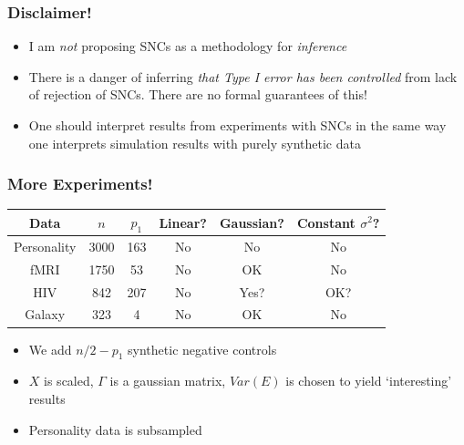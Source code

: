 \documentclass{beamer}
\begin{document}
\begin{frame}
\frametitle{Disclaimer!}
\begin{itemize}
\item I am \emph{not} proposing SNCs as a methodology for \emph{inference}
\item There is a danger of inferring \emph{that Type I error has been controlled} from lack of rejection of SNCs.
There are no formal guarantees of this!
\item One should interpret results from experiments with SNCs in the same way one interprets simulation results with purely synthetic data
\end{itemize}
\end{frame}

\begin{frame}
\frametitle{More Experiments!}
\begin{center}
\begin{tabular}{|c|c|c|c|c|c|}
\hline
Data & $n$ & $p_1$ & Linear? & Gaussian? & Constant $\sigma^2$?\\ \hline
Personality & 3000 & 163 & No & No & No\\ \hline
fMRI & 1750 & 53 & No & OK & No \\ \hline
HIV & 842 & 207 & No & Yes? & OK? \\ \hline
Galaxy & 323 & 4 & No & OK & No \\ \hline
\end{tabular}
\end{center}
\begin{itemize}
\item We add $n/2 - p_1$ synthetic negative controls
\item $X$ is scaled, $\Gamma$ is a gaussian matrix, $Var(E)$ is chosen to yield `interesting' results
\item Personality data is subsampled
\end{itemize}
\end{frame}
\end{document}
